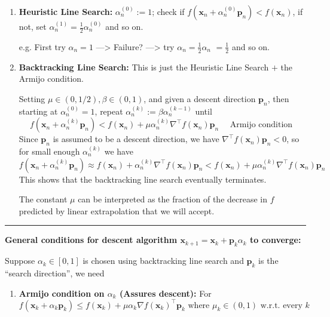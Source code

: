 \documentclass[11pt]{article}
\theoremstyle{plain} %
\newenvironment{topic}
{\color{C2}\normalfont\begin{framed}\begingroup }
  {\endgroup\end{framed}}
\theoremstyle{remark}
\begin{document}
\begin{topic}
\begin{enumerate}
    \item \textbf{Heuristic Line Search:} $\alpha_n^{(0)}:=1$; check if $f\left(\mathbf{x}_n+\alpha_n^{(0)} \mathbf{p}_n\right)<f\left(\mathbf{x}_n\right)$, if not, set $\alpha_n^{(1)}=\frac{1}{2} \alpha_n^{(0)}$ and so on.

          e.g. First try $\alpha_n=1$ ---> Failure? ---> try $\alpha_n=\frac{1}{2} \alpha_n$
          $=\frac{1}{2}$ and so on.
    \item \textbf{Backtracking Line Search:} This is just the Heuristic Line Search $+$ the Armijo condition.
          
    Setting $\mu \in(0,1 / 2), \beta \in(0,1)$, and given a descent direction $\mathbf{p}_n$, then starting at
          $\alpha_n^{(0)}=1$, repeat $\alpha_n^{(k)}:=\beta \alpha_n^{(k-1)}$ until
          \[
            f(\mathbf{x}_n+\alpha_n^{(k)} \mathbf{p}_n)<f(\mathbf{x}_n)+\mu \alpha_n^{(k)} \nabla^\top f\left(\mathbf{x}_n\right)\mathbf{p}_n
          \quad \text{ Armijo condition }
            \]
          Since $\mathbf{p}_n$ is assumed to be a descent direction, we have $\nabla^\top f\left(\mathbf{x}_n\right)
            \mathbf{p}_n<0$, so for small enough $\alpha_n^{(k)}$ we have
          \[
            f(\mathbf{x}_n+\alpha_n^{(k)} \mathbf{p}_n) 
            \approx 
            f(\mathbf{x}_n)+\alpha_n^{(k)} \nabla^\top f\left(\mathbf{x}_n\right)\mathbf{p}_n
            <
            f(\mathbf{x}_n)+\mu \alpha_n^{(k)}\nabla^\top f\left(\mathbf{x}_n\right)\mathbf{p}_n
          \]
          This shows that the backtracking line search eventually terminates.

          The constant $\mu$ can be interpreted as the fraction of the decrease in $f$
          predicted by linear extrapolation that we will accept.
  \end{enumerate}
  \vspace*{0.5em}

  \hrule

  \textbf{General conditions for descent algorithm $\mathbf{x}_{k+1}=\mathbf{x}_k+\mathbf{p}_k \alpha_k$ to converge:}

  Suppose $\alpha_k \in[0,1]$ is chosen using backtracking line search and $\mathbf{p}_k$ is the ``search direction'', we need

  \begin{enumerate}
    \item \textbf{Armijo condition on $\alpha_k$ (Assures descent):} For
          \[
            f\left(\mathbf{x}_k+\alpha_k \mathbf{p}_k\right) \leqslant f\left(\mathbf{x}_k\right)+\mu \alpha_k \nabla f\left(\mathbf{x}_k\right)^{\top} \mathbf{p}_k
            \text{ where } \mu_k\in(0,1) \text{ w.r.t. every }  k
          \]


\end{enumerate}
\end{topic}
\end{document}

